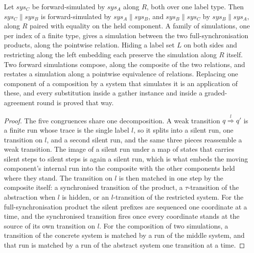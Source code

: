 \begin{theorem}
  \label{thm:forwardsim-congruence}
  \leanok
  Let $sys_C$ be forward-simulated by $sys_A$ along $R$, both over one label type.
  Then $sys_C \parallel sys_B$ is forward-simulated by $sys_A \parallel sys_B$, and $sys_B \parallel sys_C$ by $sys_B \parallel sys_A$, along $R$ paired with equality on the held component.
  A family of simulations, one per index of a finite type, gives a simulation between the two full-synchronisation products, along the pointwise relation.
  Hiding a label set $L$ on both sides and restricting along the left embedding each preserve the simulation along $R$ itself.
  Two forward simulations compose, along the composite of the two relations, and  restates a simulation along a pointwise equivalence of relations.
  Replacing one component of a composition by a system that simulates it is an application of these, and every substitution inside a gather instance and inside a graded-agreement round is proved that way.
\end{theorem}

\begin{proof}\leanok
  The five congruences share one decomposition.
  A weak transition $q \overset{l}{\Longrightarrow} q'$ is a finite run whose trace is the single label $l$, so it splits into a silent run, one transition on $l$, and a second silent run, and the same three pieces reassemble a weak transition.
  The image of a silent run under a map of states that carries silent steps to silent steps is again a silent run, which is what embeds the moving component's internal run into the composite with the other components held where they stand.
  The transition on $l$ is then matched in one step by the composite itself: a synchronised transition of the product, a $\tau$-transition of the abstraction when $l$ is hidden, or an $l$-transition of the restricted system.
  For the full-synchronisation product the silent prefixes are sequenced one coordinate at a time, and the synchronised transition fires once every coordinate stands at the source of its own transition on $l$.
  For the composition of two simulations, a transition of the concrete system is matched by a run of the middle system, and that run is matched by a run of the abstract system one transition at a time.
\end{proof}
